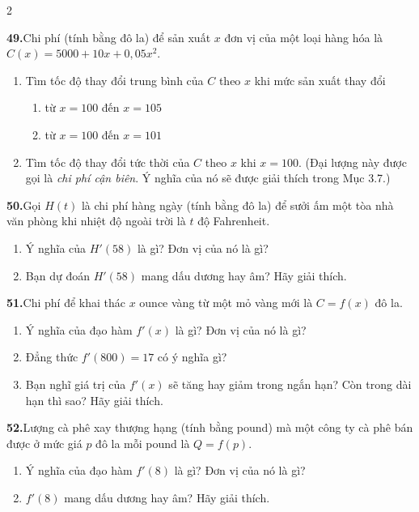 \begin{multicols*}{2}
\vspace{10pt}

\textbf{49.}\enskip Chi phí (tính bằng đô la) để sản xuất $x$ đơn vị của một loại hàng hóa là $C(x) = 5000 + 10x + 0{,}05x^2$.
\begin{enumerate}[label=(\alph*),leftmargin=1.4em,itemsep=1pt,topsep=2pt]
  \item Tìm tốc độ thay đổi trung bình của $C$ theo $x$ khi mức sản xuất thay đổi
  \begin{enumerate}[label=(\roman*),leftmargin=1.6em,itemsep=0pt,topsep=1pt]
    \item từ $x = 100$ đến $x = 105$
    \item từ $x = 100$ đến $x = 101$
  \end{enumerate}
  \item Tìm tốc độ thay đổi tức thời của $C$ theo $x$ khi $x = 100$. (Đại lượng này được gọi là \textit{chi phí cận biên}. Ý nghĩa của nó sẽ được giải thích trong Mục 3.7.)
\end{enumerate}

\vspace{5pt}

\textbf{50.}\enskip Gọi $H(t)$ là chi phí hàng ngày (tính bằng đô la) để sưởi ấm một tòa nhà văn phòng khi nhiệt độ ngoài trời là $t$ độ Fahrenheit.
\begin{enumerate}[label=(\alph*),leftmargin=1.4em,itemsep=1pt,topsep=2pt]
  \item Ý nghĩa của $H'(58)$ là gì? Đơn vị của nó là gì?
  \item Bạn dự đoán $H'(58)$ mang dấu dương hay âm? Hãy giải thích.
\end{enumerate}

\vspace{5pt}

\textbf{51.}\enskip Chi phí để khai thác $x$ ounce vàng từ một mỏ vàng mới là $C = f(x)$ đô la.
\begin{enumerate}[label=(\alph*),leftmargin=1.4em,itemsep=1pt,topsep=2pt]
  \item Ý nghĩa của đạo hàm $f'(x)$ là gì? Đơn vị của nó là gì?
  \item Đẳng thức $f'(800) = 17$ có ý nghĩa gì?
  \item Bạn nghĩ giá trị của $f'(x)$ sẽ tăng hay giảm trong ngắn hạn? Còn trong dài hạn thì sao? Hãy giải thích.
\end{enumerate}

\vspace{5pt}

\textbf{52.}\enskip Lượng cà phê xay thượng hạng (tính bằng pound) mà một công ty cà phê bán được ở mức giá $p$ đô la mỗi pound là $Q = f(p)$.
\begin{enumerate}[label=(\alph*),leftmargin=1.4em,itemsep=1pt,topsep=2pt]
  \item Ý nghĩa của đạo hàm $f'(8)$ là gì? Đơn vị của nó là gì?
  \item $f'(8)$ mang dấu dương hay âm? Hãy giải thích.
\end{enumerate}


\end{multicols*}
